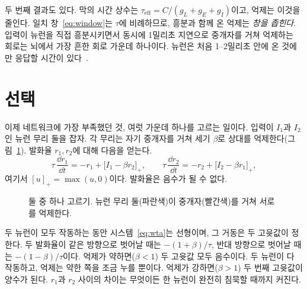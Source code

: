 두 번째 결과도 있다. 막의 시간 상수는 $\tau_{\text{eff}}=C/(g_L+g_E+g_I)$이고, 억제는 이것을 줄인다. 일치 창~\eqref{eq:window}는 $\tau$에 비례하므로, 흥분과 함께 온 억제는 \emph{창을 좁힌다}. 입력이 뉴런을 직접 흥분시키면서 동시에 1밀리초 지연으로  중개자를 거쳐 억제하는 회로는 뇌에서 가장 흔한 회로 가운데 하나이다. 뉴런은 처음 1--2밀리초 안에 온 것에만 응답할 시간이 있다~\cite{Pouille2001}.

\section{선택}

이제  네트워크에 가장 부족했던 것, 여럿 가운데 하나를 고르는 일이다. 입력이 $I_1$과 $I_2$인  뉴런 무리 둘을 잡자. 각 무리는 자기  중개자를 거쳐 세기 $\beta$로 상대를 억제한다(그림~\ref{fig:wta}). 발화율 $r_1,r_2$에 대해 다음을 얻는다.
\begin{equation}
\tau\,\frac{\dd r_1}{\dd t} = -r_1 + \bigl[I_1-\beta r_2\bigr]_+ ,\qquad
\tau\,\frac{\dd r_2}{\dd t} = -r_2 + \bigl[I_2-\beta r_1\bigr]_+ ,
\label{eq:wta}
\end{equation}
여기서 $[u]_+=\max(u,0)$이다. 발화율은 음수가 될 수 없다.

\begin{figure}[t]
\centering
{}
\caption{둘 중 하나 고르기.  뉴런 무리 둘(파란색)이  중개자(빨간색)를 거쳐 서로를 억제한다.}
\label{fig:wta}
\end{figure}

두 뉴런이 모두 작동하는 동안 시스템~\eqref{eq:wta}는 선형이며, 그 거동은 두 고윳값이 정한다. 두 발화율이 같은 방향으로 벗어날 때는 $-(1+\beta)/\tau$, 반대 방향으로 벗어날 때는 $-(1-\beta)/\tau$이다. 억제가 약하면($\beta<1$) 두 고윳값 모두 음수이다. 두 뉴런이 다 작동하고, 억제는 약한 쪽을 조금 누를 뿐이다. 억제가 강하면($\beta>1$) 두 번째 고윳값이 양수가 된다. $r_1$과 $r_2$ 사이의 차이는 무엇이든 한 뉴런이 완전히 침묵할 때까지 커진다.

